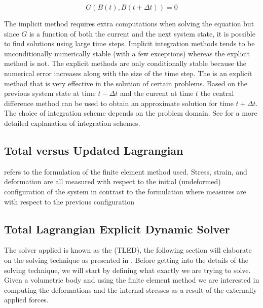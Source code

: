 \begin{equation}
G( B(t), B(t + \Delta t)) = 0
\end{equation}

The implicit method requires extra computations when solving the
equation but since $G$ is a function of both the current and the next system
state, it is possible to find solutions using
large time steps. Implicit integration methods tends to be unconditionally numerically
stable (with a few exceptions) whereas the explicit method is not. The explicit methods are
only conditionally stable because the numerical error increases along
with the size of the time step. The  is an
explicit method that is very effective in the solution of certain
problems. Based on the previous system state at time $t - \Delta t$
and the current at time $t$ the central difference method can be used
to obtain an approximate solution for time $t + \Delta t$. 
The choice of integration scheme depends on the problem
domain. See  for a more detailed explanation of
integration schemes.


\subsection{Total versus Updated Lagrangian}
 refers
to the formulation of the finite element method used. Stress, strain,
and deformation are all measured with respect to the initial
(undeformed) configuration of the system in contrast to the
 formulation where measures are with respect
to the previous configuration 


\subsection{Total Lagrangian Explicit Dynamic Solver }
\label{sec:tled_solver}
The solver applied is known as the  (TLED), the following section will
elaborate on the solving technique as presented in .
%
Before getting into the details of the solving technique, we will start
by defining what exactly we are trying to solve.
Given a volumetric body and using the finite element method we
are interested in computing the deformations and the internal stresses as a
result of the externally applied forces. \\

